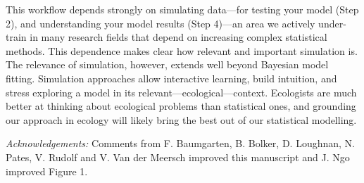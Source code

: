 \documentclass[11pt]{article}
\begin{document}
This workflow depends strongly on simulating data---for testing your model (Step 2), and understanding your model results (Step 4)---an area we actively under-train in many research fields that depend on increasing complex statistical methods. This dependence makes clear how relevant and important simulation is. The relevance of simulation, however, extends well beyond Bayesian model fitting. Simulation approaches allow interactive learning, build intuition, and stress exploring a model in its relevant---ecological---context. Ecologists are much better at thinking about ecological problems than statistical ones, and grounding our approach in ecology will likely bring the best out of our statistical modelling.


\emph{Acknowledgements:} Comments from F. Baumgarten, B. Bolker, D. Loughnan, N. Pates, V. Rudolf and V. Van der Meersch improved this manuscript and J. Ngo improved Figure 1. %

\end{document}
